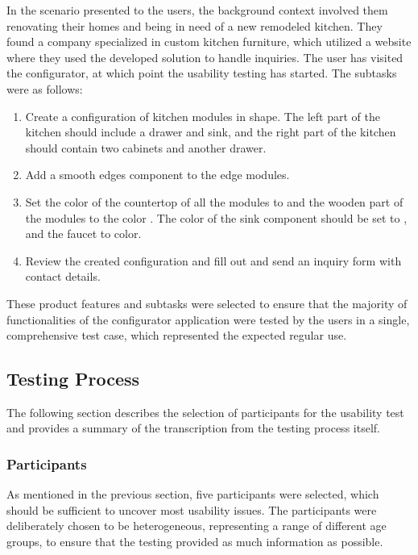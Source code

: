 In the scenario presented to the users, the background context involved them renovating their homes and being in need of a new remodeled kitchen. They found a company specialized in custom kitchen furniture, which utilized a website where they used the developed solution to handle inquiries. The user has visited the configurator, at which point the usability testing has started. The subtasks were as follows:
\begin{enumerate}
    \item Create a configuration of kitchen modules in  shape. The left part of the kitchen should include a drawer and sink, and the right part of the kitchen should contain two cabinets and another drawer.
    \item Add a smooth edges component to the edge modules.
    \item Set the color of the countertop of all the modules to  and the wooden part of the modules to the color . The color of the sink component should be set to , and the faucet to  color.
    \item Review the created configuration and fill out and send an inquiry form with contact details.
\end{enumerate}

These product features and subtasks were selected to ensure that the majority of functionalities of the configurator application were tested by the users in a single, comprehensive test case, which represented the expected regular use. 


\subsection{Testing Process}

The following section describes the selection of participants for the usability test and provides a summary of the transcription from the testing process itself. 


\subsubsection{Participants}

As mentioned in the previous section, five participants were selected, which should be sufficient to uncover most usability issues. The participants were deliberately chosen to be heterogeneous, representing a range of different age groups, to ensure that the testing provided as much information as possible.

